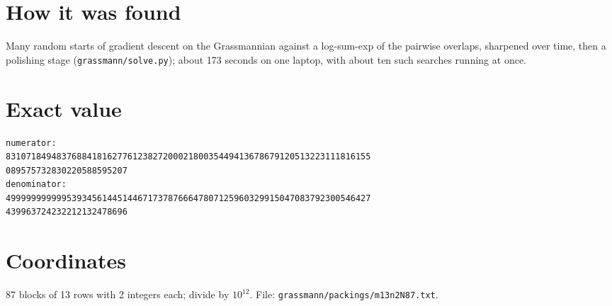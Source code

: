 \documentclass[11pt,a4paper]{article}
\begin{document}
\section{How it was found}
Many random starts of gradient descent on the Grassmannian against a log-sum-exp of the pairwise overlaps, sharpened over time, then a polishing stage (\texttt{grassmann/solve.py}); about 173 seconds on one laptop, with about ten such searches running at once.


\appendix
\section{Exact value}
{\small
\begin{verbatim}
numerator:
831071849483768841816277612382720002180035449413678679120513223111816155
089575732830220588595207
denominator:
499999999999539345614451446717378766647807125960329915047083792300546427
439963724232212132478696
\end{verbatim}}

\section{Coordinates}
87 blocks of 13 rows with 2 integers each; divide by $10^{12}$. File: \texttt{grassmann/packings/m13n2N87.txt}.
{\tiny
\begin{multicols}{4}
\end{multicols}}
\end{document}
